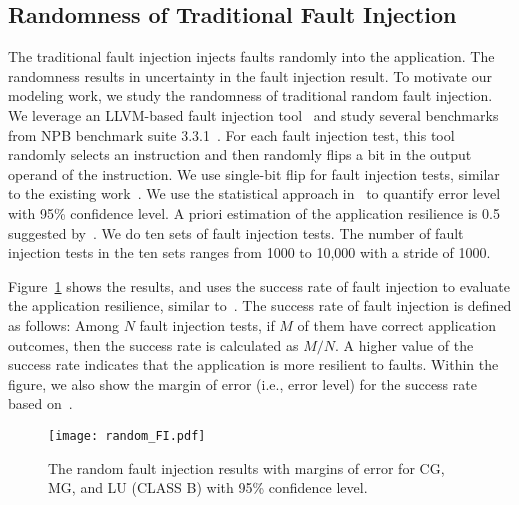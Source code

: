 \subsection{Randomness of Traditional Fault Injection}
The traditional fault injection injects faults randomly into the application.
The randomness results in uncertainty in the fault injection result. 
To motivate our modeling work, we study the randomness of traditional random fault injection.
We leverage an LLVM-based fault injection tool~\cite{europar14:calhoun} and study several  benchmarks from NPB benchmark suite 3.3.1~\cite{nas}. For each fault injection test,
this tool randomly selects an instruction and then randomly flips a bit in the output operand of the instruction. We use single-bit flip for fault injection tests,
similar to the existing work~\cite{europar14:calhoun, mg_ics12, bifit:sc12,  prdc13:sharma}.
We use the statistical approach in~\cite{date09:leveugle} to
quantify error level with 95\% confidence level.
A priori estimation of the application resilience is 0.5 suggested by~\cite{date09:leveugle}.
We do ten sets of fault injection tests.
The number of fault injection tests in the ten sets ranges
from 1000 to 10,000 with a stride of 1000.

Figure~\ref{fig:fi_randomness} shows the results, and uses the success rate of fault injection to evaluate the application resilience, similar to~\cite{ics08:bronevetsky, 
bifit:sc12,  prdc13:sharma}.
The success rate of fault injection is defined as follows: Among $N$ fault injection tests, if $M$ of them have correct application outcomes, then the
success rate is calculated as $M/N$. 
A higher value of the success rate indicates that the application is more resilient to faults.
Within the figure, we also show the margin of error (i.e., error level) for the success rate based on~\cite{date09:leveugle}.

\begin{figure}
	\begin{center}
		\texttt{[image: random\_FI.pdf]} 
		\vspace{-10pt}
		\caption{The random fault injection results with margins of error for CG, MG, and LU (CLASS B) with 95\% confidence level.}
		\label{fig:fi_randomness}
		\vspace{-15pt}
	\end{center}
\end{figure}

